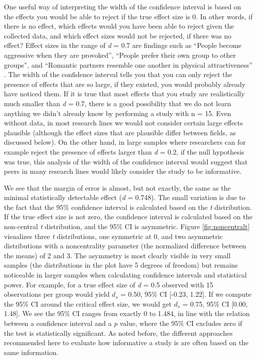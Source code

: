 \documentclass[
  oneside]{book}
\begin{document}
One useful way of interpreting the width of the confidence interval is based on the effects you would be able to reject if the true effect size is 0. In other words, if there is no effect, which effects would you have been able to reject given the collected data, and which effect sizes would not be rejected, if there was no effect? Effect sizes in the range of \emph{d} = 0.7 are findings such as ``People become aggressive when they are provoked'', ``People prefer their own group to other groups'', and ``Romantic partners resemble one another in physical attractiveness'' \citep{richard_one_2003}. The width of the confidence interval tells you that you can only reject the presence of effects that are so large, if they existed, you would probably already have noticed them. If it is true that most effects that you study are realistically much smaller than \emph{d} = 0.7, there is a good possibility that we do not learn anything we didn't already know by performing a study with n = 15. Even without data, in most research lines we would not consider certain large effects plausible (although the effect sizes that are plausible differ between fields, as discussed below). On the other hand, in large samples where researchers can for example reject the presence of effects larger than \emph{d} = 0.2, if the null hypothesis was true, this analysis of the width of the confidence interval would suggest that peers in many research lines would likely consider the study to be informative.

We see that the margin of error is almost, but not exactly, the same as the minimal statistically detectable effect (\emph{d} = 0.748). The small variation is due to the fact that the 95\% confidence interval is calculated based on the \emph{t} distribution. If the true effect size is not zero, the confidence interval is calculated based on the non-central \emph{t} distribution, and the 95\% CI is asymmetric. Figure \ref{fig:noncentralt} visualizes three \emph{t} distributions, one symmetric at 0, and two asymmetric distributions with a noncentrality parameter (the normalized difference between the means) of 2 and 3. The asymmetry is most clearly visible in very small samples (the distributions in the plot have 5 degrees of freedom) but remains noticeable in larger samples when calculating confidence intervals and statistical power. For example, for a true effect size of \emph{d} = 0.5 observed with 15 observations per group would yield \(d_s\) = 0.50, 95\% CI {[}-0.23, 1.22{]}. If we compute the 95\% CI around the critical effect size, we would get \(d_s\) = 0.75, 95\% CI {[}0.00, 1.48{]}. We see the 95\% CI ranges from exactly 0 to 1.484, in line with the relation between a confidence interval and a \emph{p} value, where the 95\% CI excludes zero if the test is statistically significant. As noted before, the different approaches recommended here to evaluate how informative a study is are often based on the same information.
\end{document}
